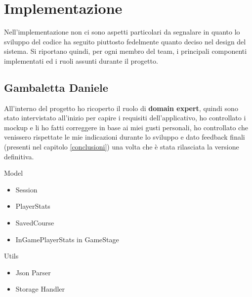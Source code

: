 
\chapter{Implementazione}\label{chap:impl}
Nell'implementazione non ci sono aspetti particolari da segnalare in quanto lo sviluppo del codice ha seguito piuttosto fedelmente quanto deciso nel design del sistema. Si riportano quindi, per ogni membro del team, i principali componenti implementati ed i ruoli assunti durante il progetto.

\section{Gambaletta Daniele}
    All'interno del progetto ho ricoperto il ruolo di \textbf{domain expert}, quindi sono stato intervistato all'inizio per capire i requisiti dell'applicativo, ho controllato i mockup e li ho fatti correggere in base ai miei gusti personali, ho controllato che venissero rispettate le mie indicazioni durante lo sviluppo e dato feedback finali (presenti nel capitolo \ref{conclusioni}) una volta che è stata rilasciata la versione definitiva.
    
    Model
    \begin{itemize}
        \item Session
        \item PlayerStats
        \item SavedCourse
        \item InGamePlayerStats in GameStage
    \end{itemize}

    Utils
    \begin{itemize}
        \item Json Parser
        \item Storage Handler
    \end{itemize}
    
